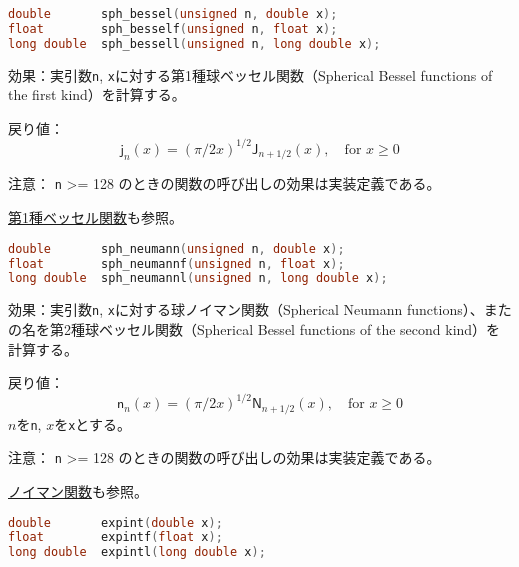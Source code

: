 \bgroup
\begin{lstlisting}[language=C++, aboveskip=0.0zw]
double       sph_bessel(unsigned n, double x);
float        sph_besself(unsigned n, float x);
long double  sph_bessell(unsigned n, long double x);
\end{lstlisting}
\egroup

\noindent
\textsf{効果}：実引数\lstinline!n!,
\lstinline!x!に対する第1種球ベッセル関数（Spherical Bessel functions of
the first kind）を計算する。

\noindent
\textsf{戻り値}：
\[
  \mathsf{j}_n(x) =
  (\pi/2x)^{1\!/\!2} \mathsf{J}_{n + 1\!/\!2}(x),
       \quad \mbox{for $x \ge 0$}
\]

\noindent
\textsf{注意}： \lstinline!n! \textgreater{}= 128
のときの関数の呼び出しの効果は実装定義である。

\noindent
\hyperref[section8-14]{第1種ベッセル関数}も参照。

%

\bgroup
\begin{lstlisting}[language=C++, aboveskip=0.0zw]
double       sph_neumann(unsigned n, double x);
float        sph_neumannf(unsigned n, float x);
long double  sph_neumannl(unsigned n, long double x);
\end{lstlisting}
\egroup

\noindent
\textsf{効果}：実引数\lstinline!n!,
\lstinline!x!に対する球ノイマン関数（Spherical Neumann
functions）、またの名を第2種球ベッセル関数（Spherical Bessel functions
of the second kind）を計算する。

\noindent
\textsf{戻り値}：
\[
  \mathsf{n}_n(x) =
  (\pi/2x)^{1\!/\!2} \mathsf{N}_{n + 1\!/\!2}(x),
       \quad \mbox{for $x \ge 0$}
\]
\hspace*{3em}\(n\)を\lstinline!n!, \(x\)を\lstinline!x!とする。

\noindent
\textsf{注意}： \lstinline!n! \textgreater{}= 128
のときの関数の呼び出しの効果は実装定義である。

\noindent
\hyperref[section8-19]{ノイマン関数}も参照。

%

\bgroup
\begin{lstlisting}[language=C++, aboveskip=0.0zw]
double       expint(double x);
float        expintf(float x);
long double  expintl(long double x);
\end{lstlisting}
\egroup

